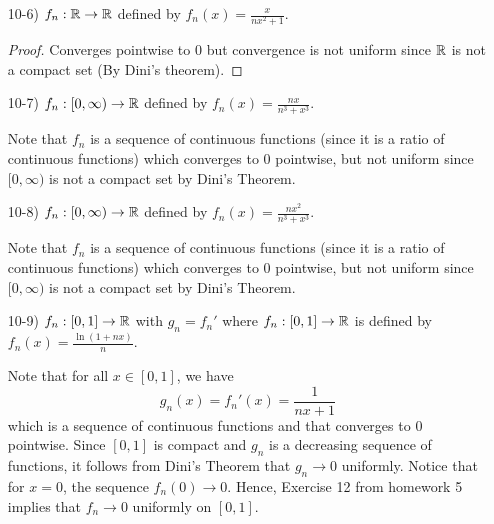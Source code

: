 \documentclass[a4paper]{article}
\begin{document}
\begin{enumerate}
    \item[10-6)] \( {f}_{n}: \mathbb{R} \to \mathbb{R}  \) defined by \( {f}_{n}(x) = \frac{ x  }{ n x^{2} + 1 }  \).
        \begin{proof}
        Converges pointwise to \( 0  \) but convergence is not uniform since \( \mathbb{R} \) is not a compact set (By Dini's theorem).
        \end{proof}
    \item[10-7)] \( {f}_{n}: [0,\infty)  \to \mathbb{R} \) defined by \( {f}_{n}(x) = \frac{ nx  }{ n^{3} + x^{3} }  \).
        \begin{solution}
            Note that \( {f}_{n} \) is a sequence of continuous functions (since it is a ratio of continuous functions) which converges to \( 0  \) pointwise, but not uniform since \( [0,\infty) \) is not a compact set by Dini's Theorem.
        \end{solution}
    \item[10-8)] \( {f}_{n}: [0,\infty) \to \mathbb{R}  \) defined by \( {f}_{n}(x) = \frac{ n x^{2} }{ n^{3} + x^{3} }  \).
        \begin{solution}
            Note that \( {f}_{n} \) is a sequence of continuous functions (since it is a ratio of continuous functions) which converges to \( 0  \) pointwise, but not uniform since \( [0,\infty) \) is not a compact set by Dini's Theorem.
        \end{solution}
    \item[10-9)]  \( {f}_{n}: [0,1] \to \mathbb{R}  \) with \( {g}_{n} = {f}_{n}' \) where \( {f}_{n}: [0,1] \to \mathbb{R}  \) is defined by \( {f}_{n}(x) = \frac{ \ln(1 + nx) }{ n }  \). 
        \begin{solution}
            Note that for all \( x \in [0,1] \), we have 
            \[  {g}_{n}(x) = {f}_{n}'(x) = \frac{ 1 }{ nx + 1 }  \]
            which is a sequence of continuous functions and that converges to \( 0  \) pointwise.
            Since \( [0,1] \) is compact and \( {g}_{n} \) is a decreasing sequence of functions, it follows from Dini's Theorem that \( {g}_{n} \to 0 \) uniformly. Notice that for \( x = 0  \), the sequence \( {f}_{n}(0) \to 0  \). Hence, Exercise 12 from homework 5 implies that \( {f}_{n} \to 0   \) uniformly on \( [0,1] \).
        \end{solution}
\end{enumerate}
\end{document}
